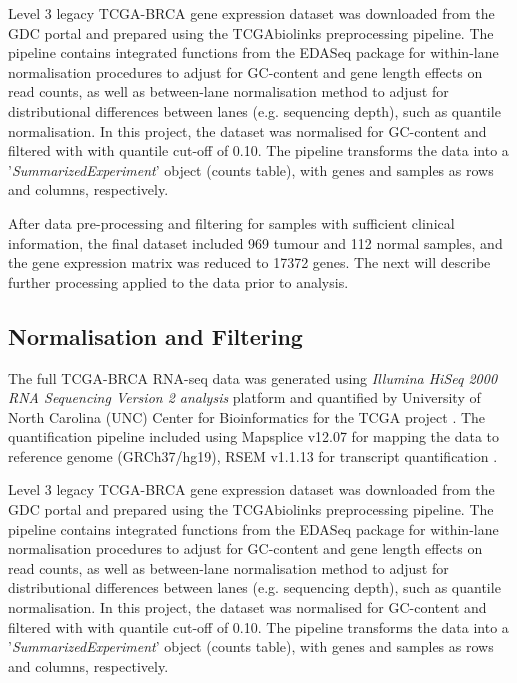     Level 3 legacy TCGA-BRCA gene expression dataset was downloaded from the GDC portal and prepared using the TCGAbiolinks preprocessing pipeline. The pipeline contains integrated functions from the EDASeq package \cite{risso2011gc} for within-lane normalisation procedures to adjust for GC-content and gene length effects on read counts, as well as between-lane normalisation method to adjust for distributional differences between lanes (e.g. sequencing depth), such as quantile normalisation\cite{Colaprico2016, PapaleoTCGAPackages}. 
    In this project, the dataset was normalised for GC-content and filtered with with quantile cut-off of 0.10. The pipeline transforms the data into a '\textit{SummarizedExperiment}' \cite{Huber2015OrchestratingBioconductor} object (counts table), with genes and samples as rows and columns, respectively. 
    
        
    After data pre-processing and filtering for samples with sufficient clinical information, the final dataset included 969 tumour and 112 normal samples, and  the gene expression matrix was reduced to 17372 genes. The next will describe further processing applied to the data prior to analysis. 
    
    
    \subsection{Normalisation and Filtering}
    
    
        The full TCGA-BRCA RNA-seq data was generated using \textit{Illumina HiSeq 2000 RNA Sequencing Version 2 analysis} platform and quantified by University of North Carolina (UNC) Center for Bioinformatics for the TCGA project \cite{UniversityofNorthCarolinaUNCCenterforBioinfromatics2013TCGAData}. The quantification pipeline included  using Mapsplice v12.07 \cite{wang2010mapsplice} for mapping the data to reference genome (GRCh37/hg19), RSEM v1.1.13 \cite{li2011rsem} for transcript quantification \cite{UniversityofNorthCarolinaUNCCenterforBioinfromatics2013TCGAData}. 

    Level 3 legacy TCGA-BRCA gene expression dataset was downloaded from the GDC portal and prepared using the TCGAbiolinks preprocessing pipeline. The pipeline contains integrated functions from the EDASeq package \cite{risso2011gc} for within-lane normalisation procedures to adjust for GC-content and gene length effects on read counts, as well as between-lane normalisation method to adjust for distributional differences between lanes (e.g. sequencing depth), such as quantile normalisation\cite{Colaprico2016, PapaleoTCGAPackages}. 
    In this project, the dataset was normalised for GC-content and filtered with with quantile cut-off of 0.10. The pipeline transforms the data into a '\textit{SummarizedExperiment}' \cite{Huber2015OrchestratingBioconductor} object (counts table), with genes and samples as rows and columns, respectively. 
    
